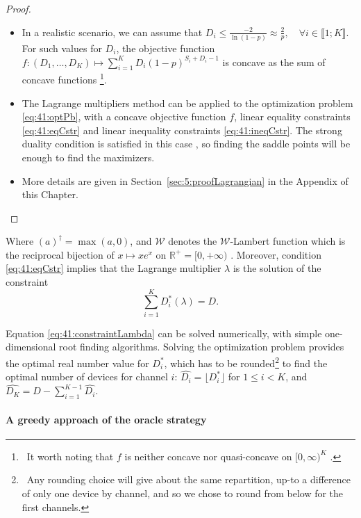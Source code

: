 \begin{proof}
\begin{itemize}
    \item
    In a realistic scenario, we can assume that $D_i\leq \frac{-2}{\ln\left(1-p\right)} \approx \frac{2}{p},\quad \forall i\in\llbracket 1;K \rrbracket$. For such values for $D_i$, the objective function $f: (D_1, \dots, D_{K}) \mapsto \sum_{i=1}^{K} D_i (1 - p)^{S_i + D_i -1}$ is concave as the sum of concave functions
    \footnote{~It worth noting that $f$ is neither concave nor quasi-concave on $[0,\infty)^{K}$ \cite{Luenberger68,Yaari77}.}.
    \item
    The Lagrange multipliers method can be applied to the optimization problem \eqref{eq:41:optPb}, with a concave objective function $f$, linear equality constraints \eqref{eq:41:eqCstr} and linear inequality constraints \eqref{eq:41:ineqCstr}. The strong duality condition is satisfied in this case \cite{BoydVanderberghe04}, so finding the saddle points will be enough to find the maximizers.
    \item
    More details are given in Section~\ref{sec:5:proofLagrangian} in the Appendix of this Chapter.
    \end{itemize}
\end{proof}

Where $(a)^{\dag} = \max(a,0)$, and $\mathcal{W}$ denotes the $\mathcal{W}$-Lambert function which is the reciprocal bijection of $x \mapsto xe^x$ on $\mathbb{R^+} = [0, +\infty)$ \cite{Corless96}.
Moreover, condition \eqref{eq:41:eqCstr} implies that the Lagrange multiplier $\lambda$ is the solution of the constraint
\begin{equation}\label{eq:41:constraintLambda}
 \sum_{i=1}^{K} D_i^*(\lambda) = D.
\end{equation}


Equation \eqref{eq:41:constraintLambda} can be solved numerically, with simple one-dimensional root finding algorithms.
Solving the optimization problem provides the optimal real number value for $D_i^*$, which has to be rounded\footnote{~Any rounding choice will give about the same repartition, up-to a difference of only one device by channel, and so we chose to round from below for the first channels.} to find the optimal number of devices for channel $i$:
%
$\widehat{D_i} = \lfloor D_i^* \rfloor$ for $1 \leq i < K$, and $\widehat{D_{K}} = D - \sum_{i=1}^{K - 1} \widehat{D_i}$.

\paragraph{A greedy approach of the oracle strategy}

